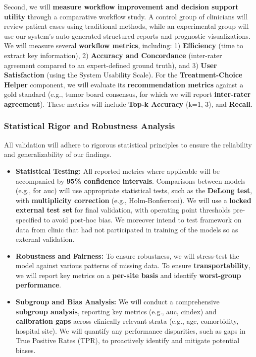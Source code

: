 \documentclass[11pt, a4paper]{article}
\begin{document}
Second, we will \textbf{measure workflow improvement and decision support utility} through a comparative workflow study. A control group of clinicians will review patient cases using traditional methods, while an experimental group will use our system's auto-generated structured reports and prognostic visualizations. We will measure several \textbf{workflow metrics}, including: 1) \textbf{Efficiency} (time to extract key information), 2) \textbf{Accuracy and Concordance} (inter-rater agreement compared to an expert-defined ground truth), and 3) \textbf{User Satisfaction} (using the System Usability Scale). For the \textbf{Treatment-Choice Helper} component, we will evaluate its \textbf{recommendation metrics} against a gold standard (e.g., tumor board consensus, for which we will report \textbf{inter-rater agreement}). These metrics will include \textbf{Top-k Accuracy} (k=1, 3), and \textbf{Recall}. 




\subsubsection{Statistical Rigor and Robustness Analysis}
All validation will adhere to rigorous statistical principles to ensure the reliability and generalizability of our findings.
\begin{itemize}
       \item \textbf{Statistical Testing:} All reported metrics where applicable will be accompanied by \textbf{95\% confidence intervals}. Comparisons between models (e.g., for \gls{auc}) will use appropriate statistical tests, such as the \textbf{DeLong test}, with \textbf{multiplicity correction} (e.g., Holm-Bonferroni). We will use a \textbf{locked external test set} for final validation, with operating point thresholds pre-specified to avoid post-hoc bias. We moreover intend to test framework on data from clinic that had not participated in training of the models so as external validation.
    
    \item \textbf{Robustness and Fairness:} To ensure robustness, we will stress-test the model against various patterns of missing data. To ensure \textbf{transportability}, we will report key metrics on a \textbf{per-site basis} and identify \textbf{worst-group performance}.
    
    \item \textbf{Subgroup and Bias Analysis:} We will conduct a comprehensive \textbf{subgroup analysis}, reporting key metrics (e.g., \gls{auc}, \gls{cindex}) and \textbf{calibration gaps} across clinically relevant strata (e.g., age, comorbidity, hospital site). We will quantify any performance disparities, such as gaps in True Positive Rates (TPR), to proactively identify and mitigate potential biases.
\end{itemize}
\end{document}

